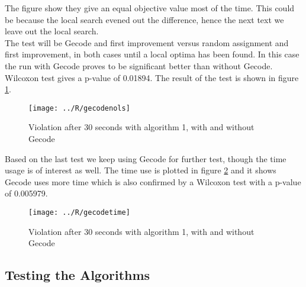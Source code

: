 The figure show they give an equal objective value most of the time. This could be because the local search 
evened out the difference, hence the next text we leave out the local search. \medskip \\
The test will be Gecode and first improvement versus random assignment and first improvement, in both cases until a 
local optima has been found. In this case the run with Gecode proves to be significant better than without Gecode. 
Wilcoxon test gives a p-value of 0.01894. The result of the test is shown in figure \ref{fig_gecodenols}. \\ 
\begin{figure}[!h]
\centering
\texttt{[image: ../R/gecodenols]} \caption{Violation after 30 seconds with 
algorithm 1, with and without Gecode}\label{fig_gecodenols}
\end{figure}\noindent
Based on the last test we keep using Gecode for further test, though the time usage is of interest as well. The time 
use is plotted in figure \ref{fig_gecodetime} and it shows Gecode uses more time which is also confirmed by a Wilcoxon 
test with a p-value of 0.005979. 
\begin{figure}[!h]
\centering
\texttt{[image: ../R/gecodetime]} \caption{Violation after 30 seconds with 
algorithm 1, with and without Gecode}\label{fig_gecodetime}
\end{figure}\noindent
\newpage
\subsection{Testing the Algorithms}






